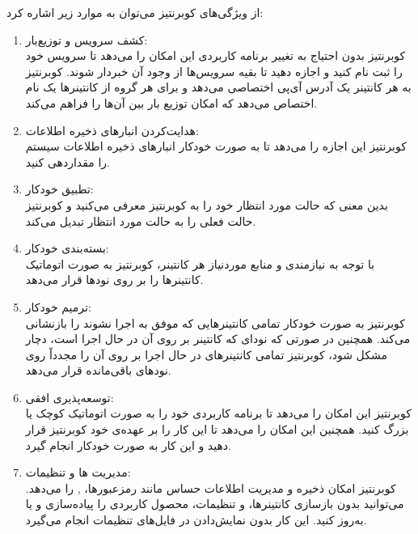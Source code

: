 از ویژگی‌های کوبرنتیز می‌توان به موارد زیر اشاره کرد:
\begin{enumerate}
	\item 
	کشف سرویس و توزیع‌بار:\\
	کوبرنتیز بدون احتیاج به تغییر برنامه کاربردی این امکان را می‌دهد تا سرویس خود را ثبت نام کنید و اجازه دهید تا بقیه سرویس‌ها از وجود آن خبردار شوند. کوبرنتیز به هر کانتینر یک آدرس آی‌پی اختصاصی می‌دهد و برای هر گروه از کانتینرها یک نام  اختصاص می‌دهد که امکان توزیع بار بین آن‌ها را فراهم می‌کند.
	\item 
	هدایت‌کردن انبارهای ذخیره اطلاعات:\\
	کوبرنتیز این اجازه را می‌دهد تا به صورت خودکار انبارهای ذخیره اطلاعات سیستم را مقداردهی کنید.
	\item 
	تطبیق خودکار:\\
	بدین معنی که حالت مورد انتظار خود را به کوبرنتیز معرفی می‌کنید و کوبرنتیز حالت فعلی را به حالت مورد انتظار تبدیل می‌کند.
	
	\item
	بسته‌بندی خودکار:\\
	با توجه به نیازمندی و منابع مورد‌نیاز هر کانتینر، کوبرنتیز به صورت اتوماتیک کانتینرها را بر روی نود‌ها قرار می‌دهد.
	\item
	ترمیم خودکار:\\
	کوبرنتیز به صورت خودکار تمامی کانتینرهایی که موفق به اجرا نشوند را بازنشانی می‌کند. همچنین در صورتی که نود‌ای که کانتینر بر روی آن در حال اجرا است، دچار مشکل شود، کوبرنتیز تمامی کانتینرهای در حال اجرا بر روی آن را مجدداً روی نود‌های باقی‌مانده قرار می‌دهد.
	\item
	توسعه‌پذیری افقی:\\
	کوبرنتیز این امکان را می‌دهد تا برنامه کاربردی خود را به صورت اتوماتیک کوچک یا بزرگ کنید. همچنین این امکان را می‌دهد تا این کار را بر عهده‌ی خود کوبرنتیز قرار دهید و این کار به صورت خودکار انجام گیرد.
	
	\item
	مدیریت 
	ها و تنظیمات:\\
	کوبرنتیز امکان ذخیره و مدیریت اطلاعات حساس مانند رمز‌عبورها، 
	, 
	را می‌دهد. می‌توانید بدون بازسازی کانتینرها، 
	و تنظیمات، محصول کاربردی را پیاده‌سازی و یا به‌روز کنید. این کار بدون نمایش‌دادن 
	در فایل‌های تنظیمات انجام می‌گیرد.
	
\end{enumerate}


